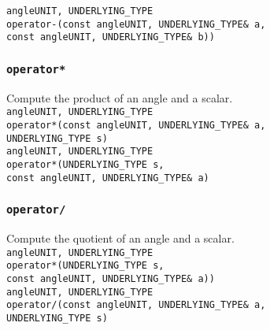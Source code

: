 \documentclass[oneside]{report}
\begin{document}
\noindent\texttt{angle\textlangle UNIT, UNDERLYING\_TYPE\textrangle}\\
\texttt{operator-}\texttt{(}\texttt{const angle\textlangle UNIT, UNDERLYING\_TYPE\textrangle\& a}\texttt{,}\\
\texttt{const angle\textlangle UNIT, UNDERLYING\_TYPE\textrangle\& b)}\texttt{)}\\

\subsubsection{\texttt{operator*}}
Compute the product of an angle and a scalar.\\

\noindent\texttt{angle\textlangle UNIT, UNDERLYING\_TYPE\textrangle}\\
\texttt{operator*}\texttt{(}\texttt{const angle\textlangle UNIT, UNDERLYING\_TYPE\textrangle\& a}\texttt{,}\\
\texttt{UNDERLYING\_TYPE s}\texttt{)}\\

\noindent{}\texttt{angle\textlangle UNIT, UNDERLYING\_TYPE\textrangle}\\
\texttt{operator*}\texttt{(}\texttt{UNDERLYING\_TYPE s}\texttt{,}\\
\texttt{const angle\textlangle UNIT, UNDERLYING\_TYPE\textrangle\& a}\texttt{)}\\

\subsubsection{\texttt{operator/}}
Compute the quotient of an angle and a scalar.\\

\noindent\texttt{angle\textlangle UNIT, UNDERLYING\_TYPE\textrangle}\\
\texttt{operator*}\texttt{(}\texttt{UNDERLYING\_TYPE s}\texttt{,}\\
\texttt{const angle\textlangle UNIT, UNDERLYING\_TYPE\textrangle\& a)}\texttt{)}\\

\noindent\texttt{angle\textlangle UNIT, UNDERLYING\_TYPE\textrangle}\\
\texttt{operator/}\texttt{(}\texttt{const angle\textlangle UNIT, UNDERLYING\_TYPE\textrangle\& a}\texttt{,}\\
\texttt{UNDERLYING\_TYPE s)}\\
\end{document}
